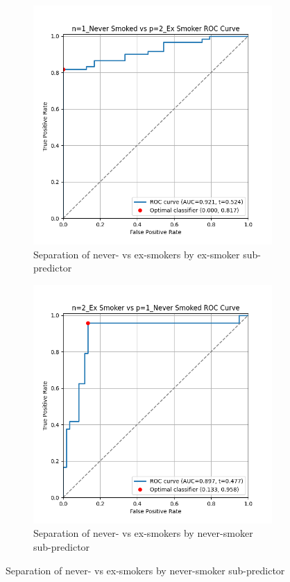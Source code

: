 \documentclass{article}
\begin{document}
\begin{figure}
    \begin{subfigure}{0.43\textwidth}
        \centering
        \includegraphics[width=\linewidth]{cohort1_1v2_roc.png}
        \caption{Separation of never- vs ex-smokers by ex-smoker sub-predictor}
    \end{subfigure}
    \hfill
    \begin{subfigure}{0.43\textwidth}
        \centering
        \includegraphics[width=\linewidth]{cohort1_2v1_roc.png}
        \caption{Separation of never- vs ex-smokers by never-smoker sub-predictor}
    \end{subfigure}


\end{figure}
\end{document}
